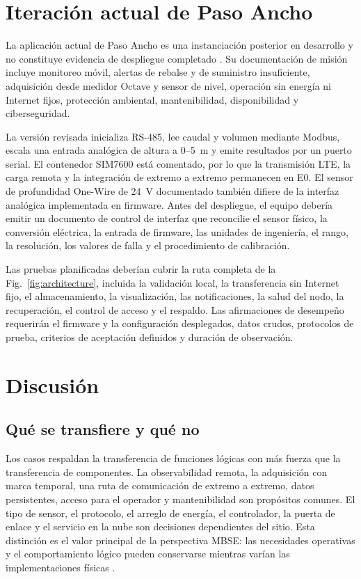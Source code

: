 \documentclass[conference]{IEEEtran}
\begin{document}
\section{Iteración actual de Paso Ancho}

La aplicación actual de Paso Ancho es una instanciación posterior en desarrollo y no constituye evidencia de despliegue completado \cite{deltalabo2026repo}. Su documentación de misión incluye monitoreo móvil, alertas de rebalse y de suministro insuficiente, adquisición desde medidor Octave y sensor de nivel, operación sin energía ni Internet fijos, protección ambiental, mantenibilidad, disponibilidad y ciberseguridad.

La versión revisada inicializa RS-485, lee caudal y volumen mediante Modbus, escala una entrada analógica de altura a 0--5~m y emite resultados por un puerto serial. El contenedor SIM7600 está comentado, por lo que la transmisión LTE, la carga remota y la integración de extremo a extremo permanecen en E0. El sensor de profundidad One-Wire de 24~V documentado también difiere de la interfaz analógica implementada en firmware. Antes del despliegue, el equipo debería emitir un documento de control de interfaz que reconcilie el sensor físico, la conversión eléctrica, la entrada de firmware, las unidades de ingeniería, el rango, la resolución, los valores de falla y el procedimiento de calibración.

Las pruebas planificadas deberían cubrir la ruta completa de la Fig.~\ref{fig:architecture}, incluida la validación local, la transferencia sin Internet fijo, el almacenamiento, la visualización, las notificaciones, la salud del nodo, la recuperación, el control de acceso y el respaldo. Las afirmaciones de desempeño requerirán el firmware y la configuración desplegados, datos crudos, protocolos de prueba, criterios de aceptación definidos y duración de observación.

\section{Discusión}

\subsection{Qué se transfiere y qué no}

Los casos respaldan la transferencia de funciones lógicas con más fuerza que la transferencia de componentes. La observabilidad remota, la adquisición con marca temporal, una ruta de comunicación de extremo a extremo, datos persistentes, acceso para el operador y mantenibilidad son propósitos comunes. El tipo de sensor, el protocolo, el arreglo de energía, el controlador, la puerta de enlace y el servicio en la nube son decisiones dependientes del sitio. Esta distinción es el valor principal de la perspectiva MBSE: las necesidades operativas y el comportamiento lógico pueden conservarse mientras varían las implementaciones físicas \cite{arguedas2025towards,voirin2018arcadia}.
\end{document}
